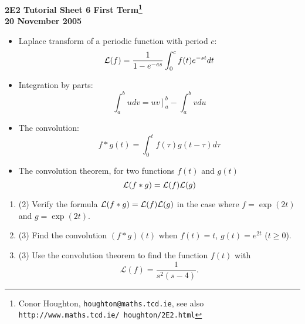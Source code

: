 \documentclass[12pt]{article}
\begin{document}
\begin{center}

{\bf 2E2 Tutorial Sheet 6 First Term\footnote{Conor Houghton, {\tt houghton@maths.tcd.ie}, see also {\tt http://www.maths.tcd.ie/ houghton/2E2.html}}\\[1cm] 20 November 2005}
\end{center}


\renewcommand{\labelenumi}{\arabic{enumi}.}

\begin{itemize}

\item Laplace transform of a periodic function with
period $c$:
\begin{equation}
{\cal L}(f)=\frac{1}{1-e^{-cs}}\int_0^c f(t)e^{-st}dt
\end{equation}

\item Integration by parts:
\begin{equation}
\int_a^b udv=\left. uv\right]_a^b-\int_a^b vdu
\end{equation}

\item The convolution:
\begin{equation}
f*g(t)=\int_0^t f(\tau)g(t-\tau)d\tau
\end{equation}


\item The convolution theorem, for two functions $f(t)$ and $g(t)$
\begin{equation}
{\cal L}(f*g)={\cal L}(f){\cal L}(g)
\end{equation}

\end{itemize}

\vskip 1cm


\begin{enumerate}

\item (2) Verify the formula ${\cal L}(f*g)={\cal L}(f){\cal L}(g)$ in the case where $f=\exp{(2t)}$ and $g=\exp{(2t)}$. 
\vskip 1cm
\item (3) Find the convolution $(f*g)(t)$ when $f(t) = t$, $g(t) = e^{2t}$ ($t
\geq 0$).
\vskip 1cm
\item (3) Use the convolution theorem to find the function $f(t)$ with
\begin{equation}
\mathcal{L}(f) = \frac{1}{s^2(s-4)}.
\end{equation}

\end{enumerate}

\vfill
\end{document}
